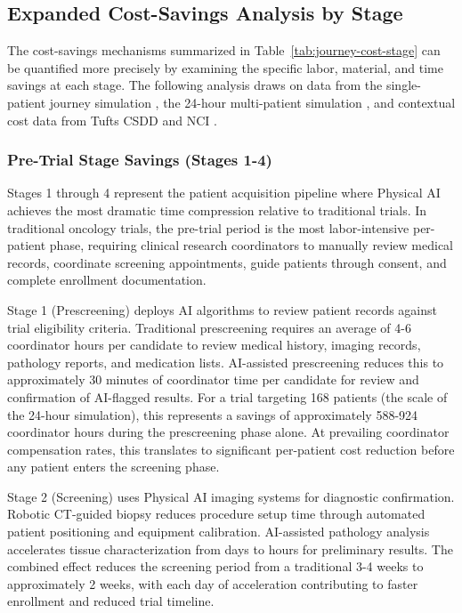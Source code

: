 \subsection{Expanded Cost-Savings Analysis by Stage}
\label{subsec:journey-cost-expanded}

The cost-savings mechanisms summarized in Table~\ref{tab:journey-cost-stage}
can be quantified more precisely by examining the specific labor, material, and
time savings at each stage. The following analysis draws on data from the
single-patient journey simulation \cite{patient-journey-paper}, the 24-hour
multi-patient simulation \cite{site-docs}, and contextual cost data from Tufts
CSDD \cite{tufts-delay} and NCI \cite{nci-trials-paying}.

\subsubsection{Pre-Trial Stage Savings (Stages 1-4)}

Stages 1 through 4 represent the patient acquisition pipeline where Physical
AI achieves the most dramatic time compression relative to traditional trials.
In traditional oncology trials, the pre-trial period is the most
labor-intensive per-patient phase, requiring clinical research coordinators to
manually review medical records, coordinate screening appointments, guide
patients through consent, and complete enrollment documentation.

Stage 1 (Prescreening) deploys AI algorithms to review patient records
against trial eligibility criteria. Traditional prescreening requires an
average of 4-6 coordinator hours per candidate to review medical history,
imaging records, pathology reports, and medication lists. AI-assisted
prescreening reduces this to approximately 30 minutes of coordinator time per
candidate for review and confirmation of AI-flagged results. For a trial
targeting 168 patients (the scale of the 24-hour simulation), this represents
a savings of approximately 588-924 coordinator hours during the prescreening
phase alone. At prevailing coordinator compensation rates, this translates to
significant per-patient cost reduction before any patient enters the screening
phase.

Stage 2 (Screening) uses Physical AI imaging systems for diagnostic
confirmation. Robotic CT-guided biopsy reduces procedure setup time through
automated patient positioning and equipment calibration. AI-assisted pathology
analysis accelerates tissue characterization from days to hours for
preliminary results. The combined effect reduces the screening period from a
traditional 3-4 weeks to approximately 2 weeks, with each day of acceleration
contributing to faster enrollment and reduced trial timeline.

